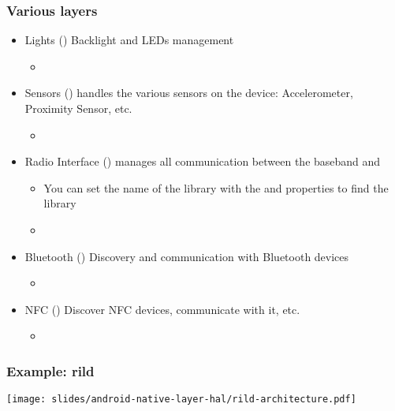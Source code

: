 \begin{frame}
  \frametitle{Various layers}
  \begin{itemize}
  \item Lights () Backlight and LEDs management
    \begin{itemize}
    \item {}
    \end{itemize}
  \item Sensors () handles the various sensors on
    the device: Accelerometer, Proximity Sensor, etc.
    \begin{itemize}
    \item {}
    \end{itemize}
  \item Radio Interface () manages all
    communication between the baseband and 
    \begin{itemize}
    \item You can set the name of the library with the  and
       properties to find the library
    \item {}
    \end{itemize}
  \item Bluetooth () Discovery and communication
    with Bluetooth devices
    \begin{itemize}
    \item {}
    \end{itemize}
  \item NFC () Discover NFC devices, communicate
    with it, etc.
    \begin{itemize}
    \item {}
    \end{itemize}
  \end{itemize}
\end{frame}

\begin{frame}
  \frametitle{Example: rild}
  \begin{center}
    \texttt{[image: slides/android-native-layer-hal/rild-architecture.pdf]}
  \end{center}
\end{frame}
